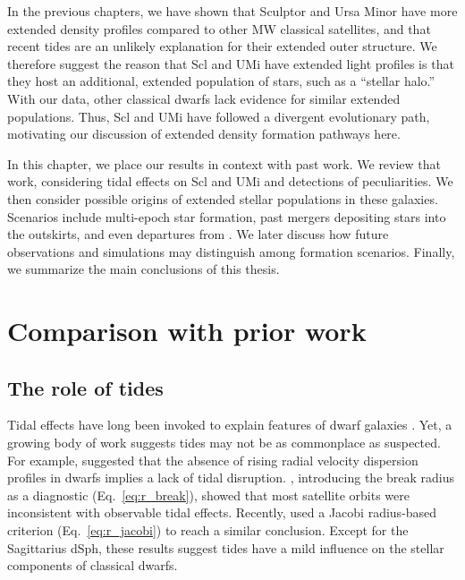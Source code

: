In the previous chapters, we have shown that Sculptor and Ursa Minor
have more extended density profiles compared to other MW classical
satellites, and that recent tides are an unlikely explanation for their
extended outer structure. We therefore suggest the reason that Scl and
UMi have extended light profiles is that they host an additional,
extended population of stars, such as a ``stellar halo.'' With our data,
other classical dwarfs lack evidence for similar extended populations.
Thus, Scl and UMi have followed a divergent evolutionary path,
motivating our discussion of extended density formation pathways here.

In this chapter, we place our results in context with past work. We
review that work, considering tidal effects on Scl and UMi and
detections of peculiarities. We then consider possible origins of
extended stellar populations in these galaxies. Scenarios include
multi-epoch star formation, past mergers depositing stars into the
outskirts, and even departures from \LCDM{}. We later discuss how future
observations and simulations may distinguish among formation scenarios.
Finally, we summarize the main conclusions of this thesis.

\section{Comparison with prior work}\label{comparison-with-prior-work}

\subsection{The role of tides}\label{the-role-of-tides}

Tidal effects have long been invoked to explain features of dwarf
galaxies \citep[e.g.,
Section~\ref{sec:scl_umi_obs_tides},][]{mayer+2001a, tsujimoto+shigeyama2002}.
Yet, a growing body of work suggests tides may not be as commonplace as
suspected. For example, \citet{read+2006} suggested that the absence of
rising radial velocity dispersion profiles in dwarfs implies a lack of
tidal disruption. \citet{penarrubia+2009}, introducing the break radius
as a diagnostic (Eq.~\ref{eq:r_break}), showed that most satellite
orbits were inconsistent with observable tidal effects. Recently,
\citet{pace+erkal+li2022} used a Jacobi radius-based criterion
(Eq.~\ref{eq:r_jacobi}) to reach a similar conclusion. Except for the
Sagittarius dSph, these results suggest tides have a mild influence on
the stellar components of classical dwarfs.

